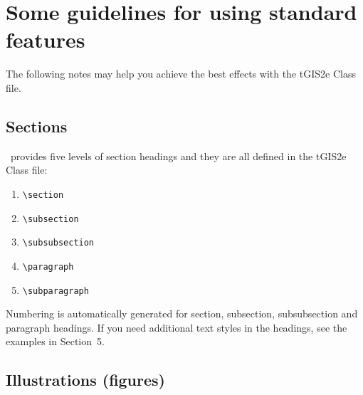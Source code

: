 \documentclass[]{tGIS2e}
\begin{document}
\section[]{Some guidelines for using standard features}

The following notes may help you achieve the best effects with the tGIS2e Class file.

\subsection{Sections}

\LaTeXe\ provides five levels of section headings and they are all defined in the tGIS2e Class file:
\begin{enumerate}
   \item[(A)] \verb"\section"
   \item[(B)] \verb"\subsection"
   \item[(C)] \verb"\subsubsection"
   \item[(D)] \verb"\paragraph"
   \item[(E)] \verb"\subparagraph"
\end{enumerate}
Numbering is automatically generated for section, subsection, subsubsection and paragraph headings.  If you need
additional text styles in the headings, see the examples in Section~5.

\subsection{Illustrations (figures)}
\end{document}
